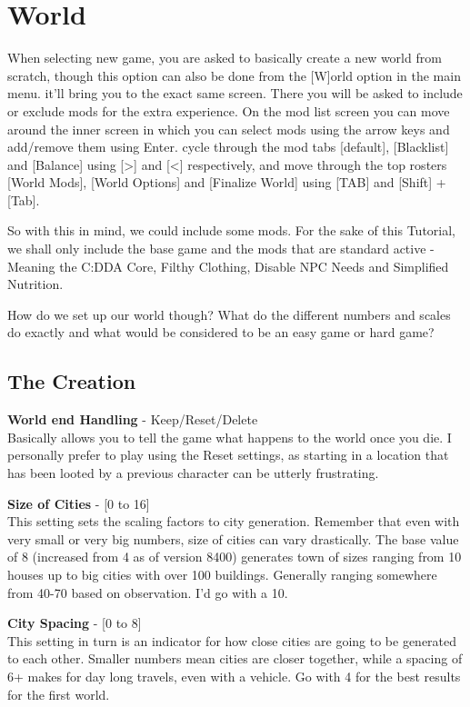 \chapter{World}

When selecting new game, you are asked to basically create a new world from scratch, though this option can also be done from the [W]orld option in the main menu. it'll bring you to the exact same screen. There you will be asked to include or exclude mods for the extra experience.
On the mod list screen you can move around the inner screen in which you can select mods using the arrow keys and add/remove them using Enter. cycle through the mod tabs [default], [Blacklist] and [Balance] using [>] and [<] respectively, and move through the top rosters [World Mods], [World Options] and [Finalize World] using [TAB] and [Shift] + [Tab].

So with this in mind, we could include some mods. For the sake of this Tutorial, we shall only include the base game and the mods that are standard active - Meaning the C:DDA Core, Filthy Clothing, Disable NPC Needs and Simplified Nutrition.

How do we set up our world though? What do the different numbers and scales do exactly and what would be considered to be an easy game or hard game?


\section{The Creation}

\textbf{World end Handling} - Keep/Reset/Delete\\Basically allows you to tell the game what happens to the world once you die. I personally prefer to play using the Reset settings, as starting in a location that has been looted by a previous character can be utterly frustrating.

\textbf{Size of Cities} - [0 to 16]\\This setting sets the scaling factors to city generation. Remember that even with very small or very big numbers, size of cities can vary drastically. The base value of 8 (increased from 4 as of version 8400)  generates town of sizes ranging from 10 houses up to big cities with over 100 buildings. Generally ranging somewhere from 40-70 based on observation. I'd go with a 10.

\textbf{City Spacing} - [0 to 8]\\This setting in turn is an indicator for how close cities are going to be generated to each other. Smaller numbers mean cities are closer together, while a spacing of 6+ makes for day long travels, even with a vehicle. Go with 4 for the best results for the first world.

